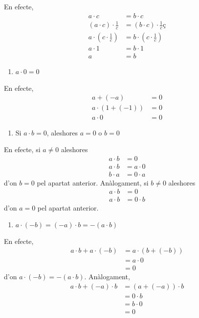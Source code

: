 En efecte,%
\begin{align*}
a\cdot c &=b\cdot c \\
(a\cdot c)\cdot \frac{1}{c} &=(b\cdot c)\cdot \frac{1}{c}\text{ç} \\
a\cdot \left( c\cdot \frac{1}{c}\right) &=b\cdot \left( c\cdot \frac{1}{c}%
\right) \\
a\cdot 1 &=b\cdot 1 \\
a &=b
\end{align*}

\begin{enumerate}
\item[7.] $a\cdot 0=0$
\end{enumerate}

En efecte,%
\begin{align*}
a+(-a) &=0 \\
a\cdot (1+(-1)) &=0 \\
a\cdot 0 &=0
\end{align*}

\begin{enumerate}
\item[8.] Si $a\cdot b=0$, aleshores $a=0$ o $b=0$
\end{enumerate}

En efecte, si $a\neq 0$ aleshores%
\begin{align*}
a\cdot b &=0 \\
a\cdot b &=a\cdot 0 \\
b\cdot a &=0\cdot a
\end{align*}%
d’on $b=0$ pel apartat anterior. Anàlogament, si $b\neq 0$
aleshores%
\begin{align*}
a\cdot b &=0 \\
a\cdot b &=0\cdot b
\end{align*}%
d’on $a=0$ pel apartat anterior.

\begin{enumerate}
\item[9.] $a\cdot (-b)=(-a)\cdot b=-(a\cdot b)$
\end{enumerate}

En efecte,%
\begin{align*}
a\cdot b+a\cdot (-b) &=a\cdot (b+(-b)) \\
&=a\cdot 0 \\
&=0
\end{align*}%
d’on $a\cdot (-b)=-(a\cdot b)$. Anàlogament,%
\begin{align*}
a\cdot b+(-a)\cdot b &=(a+(-a))\cdot b \\
&=0\cdot b \\
&=b\cdot 0 \\
&=0
\end{align*}

